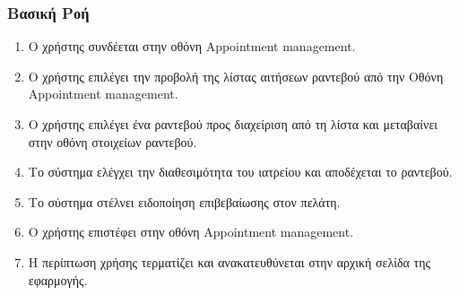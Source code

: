 \documentclass[12pt,a4paper,twoside]{book}
\begin{document}
\subsubsection{Βασική Ροή}
\begin{enumerate}
  \item Ο χρήστης συνδέεται στην οθόνη Appointment management. %
  \item Ο χρήστης επιλέγει την προβολή της λίστας αιτήσεων ραντεβού από την  Οθόνη Appointment management.
  \item Ο χρήστης επιλέγει ένα ραντεβού προς διαχείριση από τη λίστα και μεταβαίνει στην οθόνη στοιχείων ραντεβού. %
  \item Το σύστημα ελέγχει την διαθεσιμότητα του ιατρείου και αποδέχεται το ραντεβού. %
  \item Το σύστημα στέλνει ειδοποίηση επιβεβαίωσης στον πελάτη.  %
  \item Ο χρήστης επιστέφει στην οθόνη Appointment management.
  \item Η περίπτωση χρήσης τερματίζει και ανακατευθύνεται στην αρχική σελίδα της εφαρμογής. %
\end{enumerate}
\end{document}
